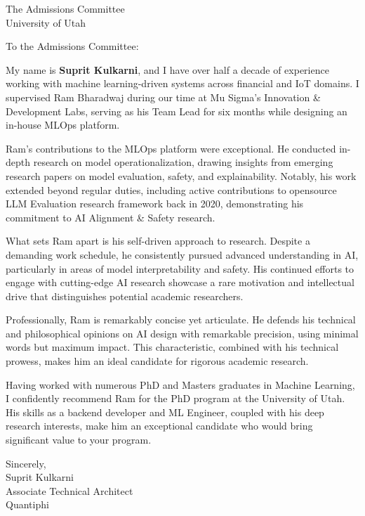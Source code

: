 \documentclass[11pt]{letter}
\begin{document}
\begin{letter}{The Admissions Committee \\ University of Utah}
\opening{To the Admissions Committee:}

My name is \textbf{Suprit Kulkarni}, and I have over half a decade of experience working with machine learning-driven systems across financial and IoT domains. I supervised Ram Bharadwaj during our time at Mu Sigma's Innovation \& Development Labs, serving as his Team Lead for six months while designing an in-house MLOps platform.

Ram's contributions to the MLOps platform were exceptional. He conducted in-depth research on model operationalization, drawing insights from emerging research papers on model evaluation, safety, and explainability. Notably, his work extended beyond regular duties, including active contributions to opensource LLM Evaluation research framework back in 2020, demonstrating his commitment to AI Alignment \& Safety research.

What sets Ram apart is his self-driven approach to research. Despite a demanding work schedule, he consistently pursued advanced understanding in AI, particularly in areas of model interpretability and safety. His continued efforts to engage with cutting-edge AI research showcase a rare motivation and intellectual drive that distinguishes potential academic researchers.

Professionally, Ram is remarkably concise yet articulate. He defends his technical and philosophical opinions on AI design with remarkable precision, using minimal words but maximum impact. This characteristic, combined with his technical prowess, makes him an ideal candidate for rigorous academic research.

Having worked with numerous PhD and Masters graduates in Machine Learning, I confidently recommend Ram for the PhD program at the University of Utah. His skills as a backend developer and ML Engineer, coupled with his deep research interests, make him an exceptional candidate who would bring significant value to your program.

\closing{Sincerely,\\[4pt]
Suprit Kulkarni\\
Associate Technical Architect\\
Quantiphi}

\end{letter}
\end{document}

